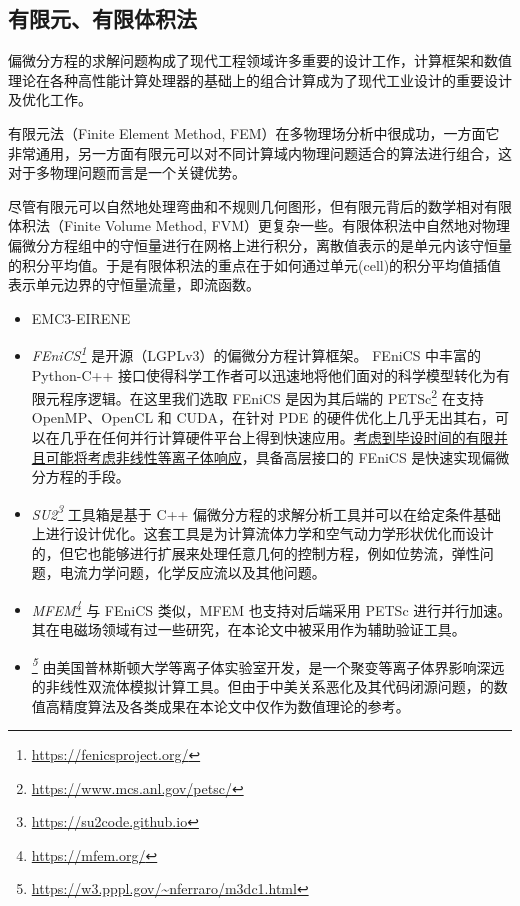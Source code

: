 \subsection{有限元、有限体积法}
偏微分方程的求解问题构成了现代工程领域许多重要的设计工作，计算框架和数值理论在各种高性能计算处理器的基础上的组合计算成为了现代工业设计的重要设计及优化工作。

有限元法（Finite Element Method, FEM）在多物理场分析中很成功，一方面它非常通用，另一方面有限元可以对不同计算域内物理问题适合的算法进行组合，这对于多物理问题而言是一个关键优势。

尽管有限元可以自然地处理弯曲和不规则几何图形，但有限元背后的数学相对有限体积法（Finite Volume Method, FVM）更复杂一些。有限体积法中自然地对物理偏微分方程组中的守恒量进行在网格上进行积分，离散值表示的是单元内该守恒量的积分平均值。于是有限体积法的重点在于如何通过单元(cell)的积分平均值插值表示单元边界的守恒量流量，即流函数。


\begin{itemize}
    \item EMC3-EIRENE
    \item \textit{FEniCS\footnote{\url{https://fenicsproject.org/}}} 是开源（LGPLv3）的偏微分方程计算框架。 FEniCS 中丰富的 Python-C++ 接口使得科学工作者可以迅速地将他们面对的科学模型转化为有限元程序逻辑。在这里我们选取 FEniCS 是因为其后端的 PETSc\footnote{\url{https://www.mcs.anl.gov/petsc/}} 在支持 OpenMP、OpenCL 和 CUDA，在针对 PDE 的硬件优化上几乎无出其右，可以在几乎在任何并行计算硬件平台上得到快速应用。\underline{考虑到毕设时间的有限并且可能将考虑非线性等离子体响应}，具备高层接口的 FEniCS 是快速实现偏微分方程的手段。
    \item \textit{SU2\footnote{\url{https://su2code.github.io}}} 工具箱是基于 C++ 偏微分方程的求解分析工具并可以在给定条件基础上进行设计优化。这套工具是为计算流体力学和空气动力学形状优化而设计的，但它也能够进行扩展来处理任意几何的控制方程，例如位势流，弹性问题，电流力学问题，化学反应流以及其他问题。
    \item \textit{MFEM\footnote{\url{https://mfem.org/}}} 与 FEniCS 类似，MFEM 也支持对后端采用 PETSc 进行并行加速。其在电磁场领域有过一些研究，在本论文中被采用作为辅助验证工具。
    \item \textit{\mdddc \footnote{\url{https://w3.pppl.gov/~nferraro/m3dc1.html}}} 由美国普林斯顿大学等离子体实验室开发，是一个聚变等离子体界影响深远的非线性双流体模拟计算工具。但由于中美关系恶化及其代码闭源问题，\mdddc 的数值高精度算法及各类成果在本论文中仅作为数值理论的参考。
\end{itemize}


